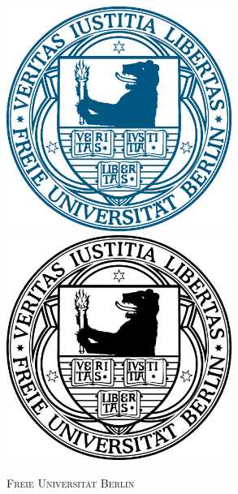 
\thispagestyle{empty}
\hypersetup{pageanchor=false}
\begin{titlepage}
	\centering
	\vspace{2cm}
	{\textbf{\@subject}}
	\vspace{0.5cm}

	{\textbf{\huge \@title}}
    
	{\large \@author}
	\vspace{0.5cm}

	\ifx{}\undefined
	\else
		\if{}
		\centering
			\includegraphics[width=0.55\textwidth]{images/Siegel_blau_RGB.eps}
		\else
			\includegraphics[width=0.55\textwidth]{images/FUSiegel_sw_RGB.eps}
		\fi
	\fi

	{\scshape\LARGE Freie Universität Berlin}
    

\end{titlepage}
